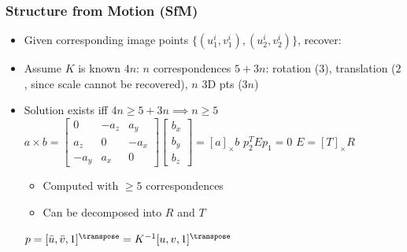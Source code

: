 \subsubsection{Structure from Motion (SfM)}
\begin{itemize}
    \item Given corresponding image points $\{(u_1^i, v_1^i), (u_2^i, v_2^i)\}$, recover:
    \item Assume $K$ is known
     $4n$: $n$ correspondences
     $5 + 3n$: rotation ($3$), translation ($2$, since scale cannot be recovered), $n$ 3D pts ($3n$)
    \item Solution exists iff $4n \ge 5 + 3n \implies n \ge 5$
     $a \times b =
        \begin{bmatrix}
            0 & -a_z & a_y\\
            a_z & 0 & -a_x\\
            -a_y & a_x & 0
        \end{bmatrix}
        \begin{bmatrix}
            b_x\\
            b_y\\
            b_z
        \end{bmatrix} = [a]_\times b$
     $p_2^T E p_1 = 0$
     $E = [T]_\times R$
        \begin{itemize}
            \item Computed with $\ge 5$ correspondences
            \item Can be decomposed into $R$ and $T$
        \end{itemize}
     $p = [\bar u, \bar v, 1]^\transpose = K^{-1}[u, v, 1]^\transpose$
        \begin{itemize}

\end{itemize}
\end{itemize}
